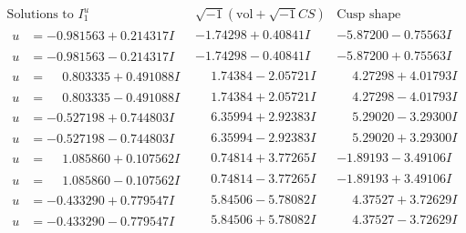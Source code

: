 \documentclass[1p]{elsarticle_modified}
\theoremstyle{definition}
\newcommand{\I}{\sqrt{-1}}
\begin{document}
$$\begin{array}{c|c|c}  
\text{Solutions to }I^u_{1}& \I (\text{vol} + \sqrt{-1}CS) & \text{Cusp shape}\\
 \hline 
\begin{aligned}
u &= -0.981563 + 0.214317 I\end{aligned}
 & -1.74298 + 0.40841 I & -5.87200 - 0.75563 I \\ \hline\begin{aligned}
u &= -0.981563 - 0.214317 I\end{aligned}
 & -1.74298 - 0.40841 I & -5.87200 + 0.75563 I \\ \hline\begin{aligned}
u &= \phantom{-}0.803335 + 0.491088 I\end{aligned}
 & \phantom{-}1.74384 - 2.05721 I & \phantom{-}4.27298 + 4.01793 I \\ \hline\begin{aligned}
u &= \phantom{-}0.803335 - 0.491088 I\end{aligned}
 & \phantom{-}1.74384 + 2.05721 I & \phantom{-}4.27298 - 4.01793 I \\ \hline\begin{aligned}
u &= -0.527198 + 0.744803 I\end{aligned}
 & \phantom{-}6.35994 + 2.92383 I & \phantom{-}5.29020 - 3.29300 I \\ \hline\begin{aligned}
u &= -0.527198 - 0.744803 I\end{aligned}
 & \phantom{-}6.35994 - 2.92383 I & \phantom{-}5.29020 + 3.29300 I \\ \hline\begin{aligned}
u &= \phantom{-}1.085860 + 0.107562 I\end{aligned}
 & \phantom{-}0.74814 + 3.77265 I & -1.89193 - 3.49106 I \\ \hline\begin{aligned}
u &= \phantom{-}1.085860 - 0.107562 I\end{aligned}
 & \phantom{-}0.74814 - 3.77265 I & -1.89193 + 3.49106 I \\ \hline\begin{aligned}
u &= -0.433290 + 0.779547 I\end{aligned}
 & \phantom{-}5.84506 - 5.78082 I & \phantom{-}4.37527 + 3.72629 I \\ \hline\begin{aligned}
u &= -0.433290 - 0.779547 I\end{aligned}
 & \phantom{-}5.84506 + 5.78082 I & \phantom{-}4.37527 - 3.72629 I \\ \hline\begin{aligned}

\end{aligned}
\end{array}$$
\end{document}
